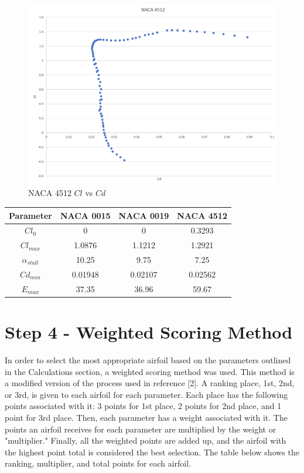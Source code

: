 \documentclass{article}
\begin{document}
\begin{figure}
\begin{center}
	\includegraphics[scale=0.4]{NACA4512clvscd.png}
	\caption{NACA 4512 $Cl$ vs $Cd$}
	\label{Figure 6:}
\end{center}
\end{figure}
\begin{tabular}[pos]{| c | c | c | c |}


\hline
Parameter & NACA 0015 & NACA 0019 & NACA 4512 \\ \hline
$Cl_{0}$ & 0 & 0 & 0.3293   \\ \hline
$Cl_{max}$  & 1.0876 & 1.1212 & 1.2921  \\ \hline
$\alpha_{stall}$ & 10.25 & 9.75 & 7.25 \\ \hline
$Cd_{min}$ & 0.01948 & 0.02107 & 0.02562 \\ \hline
$E_{max}$ & 37.35 & 36.96 & 59.67 \\ \hline


\end{tabular}

\section*{Step 4 - Weighted Scoring Method}

In order to select the most appropriate airfoil based on the parameters outlined in the Calculations section, a weighted scoring method was used. This method is a modified version of the process used in reference [2]. A ranking place, 1st, 2nd, or 3rd, is given to each airfoil for each parameter. Each place has the following points associated with it: 3 points for 1st place, 2 points for 2nd place, and 1 point for 3rd place. Then, each parameter has a weight associated with it. The points an airfoil receives for each parameter are multiplied by the weight or "multiplier." Finally, all the weighted points are added up, and the airfoil with the highest point total is considered the best selection. The table below shows the ranking, multiplier, and total points for each airfoil. \\ \\
\end{document}

